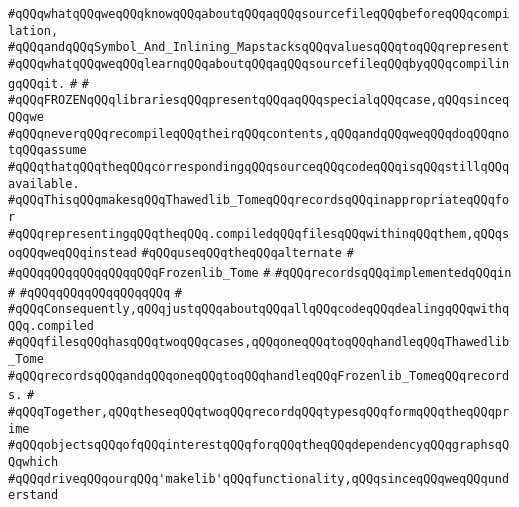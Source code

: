\verb|#qQQqwhatqQQqweqQQqknowqQQqaboutqQQqaqQQqsourcefileqQQqbeforeqQQqcompilation,|\newline
\verb|#qQQqandqQQqSymbol_And_Inlining_MapstacksqQQqvaluesqQQqtoqQQqrepresent|\newline
\verb|#qQQqwhatqQQqweqQQqlearnqQQqaboutqQQqaqQQqsourcefileqQQqbyqQQqcompilingqQQqit.|\newline
\verb|#|\newline
\verb|#|\newline
\verb|#qQQqFROZENqQQqlibrariesqQQqpresentqQQqaqQQqspecialqQQqcase,qQQqsinceqQQqwe|\newline
\verb|#qQQqneverqQQqrecompileqQQqtheirqQQqcontents,qQQqandqQQqweqQQqdoqQQqnotqQQqassume|\newline
\verb|#qQQqthatqQQqtheqQQqcorrespondingqQQqsourceqQQqcodeqQQqisqQQqstillqQQqavailable.|\newline
\verb|#qQQqThisqQQqmakesqQQqThawedlib_TomeqQQqrecordsqQQqinappropriateqQQqfor|\newline
\verb|#qQQqrepresentingqQQqtheqQQq.compiledqQQqfilesqQQqwithinqQQqthem,qQQqsoqQQqweqQQqinstead|\newline
\verb|#qQQquseqQQqtheqQQqalternate|\newline
\verb|#|\newline
\verb|#qQQqqQQqqQQqqQQqqQQqFrozenlib_Tome|\newline
\verb|#|\newline
\verb|#qQQqrecordsqQQqimplementedqQQqin|\newline
\verb|#|\newline
\verb|#qQQqqQQqqQQqqQQqqQQq|\newline
\verb|#|\newline
\verb|#qQQqConsequently,qQQqjustqQQqaboutqQQqallqQQqcodeqQQqdealingqQQqwithqQQq.compiled|\newline
\verb|#qQQqfilesqQQqhasqQQqtwoqQQqcases,qQQqoneqQQqtoqQQqhandleqQQqThawedlib_Tome|\newline
\verb|#qQQqrecordsqQQqandqQQqoneqQQqtoqQQqhandleqQQqFrozenlib_TomeqQQqrecords.|\newline
\verb|#|\newline
\verb|#qQQqTogether,qQQqtheseqQQqtwoqQQqrecordqQQqtypesqQQqformqQQqtheqQQqprime|\newline
\verb|#qQQqobjectsqQQqofqQQqinterestqQQqforqQQqtheqQQqdependencyqQQqgraphsqQQqwhich|\newline
\verb|#qQQqdriveqQQqourqQQq'makelib'qQQqfunctionality,qQQqsinceqQQqweqQQqunderstand|\newline
